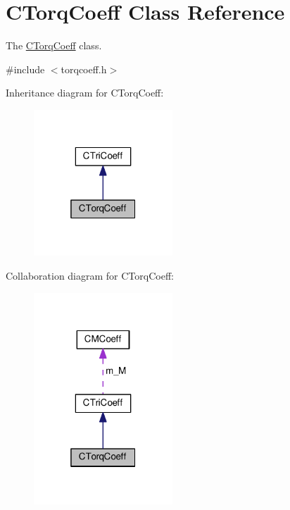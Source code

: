 \hypertarget{classCTorqCoeff}{\section{C\-Torq\-Coeff Class Reference}
\label{classCTorqCoeff}
}


The \hyperlink{classCTorqCoeff}{C\-Torq\-Coeff} class.  




{\ttfamily \#include $<$torqcoeff.\-h$>$}



Inheritance diagram for C\-Torq\-Coeff\-:
\nopagebreak
\begin{figure}[H]
\begin{center}
\leavevmode
\includegraphics[width=148pt]{classCTorqCoeff__inherit__graph}
\end{center}
\end{figure}


Collaboration diagram for C\-Torq\-Coeff\-:
\nopagebreak
\begin{figure}[H]
\begin{center}
\leavevmode
\includegraphics[width=148pt]{classCTorqCoeff__coll__graph}
\end{center}
\end{figure}
